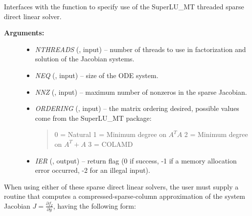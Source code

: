 \documentclass[letterpaper,10pt,english]{sphinxmanual}
\begin{document}
\begin{fulllineitems}
\label{f_interface/Usage:f/_/FARKSUPERLUMT}
Interfaces with the {\hyperref[c_interface/User_callable:c.ARKSuperLUMT]{\emph{}}} function
to specify use of the SuperLU\_MT threaded sparse direct linear solver.
\begin{description}
\item[{\textbf{Arguments:}}] \leavevmode\begin{itemize}
\item {} 
\emph{NTHREADS} (, input) -- number of threads to use in
factorization and solution of the Jacobian systems.

\item {} 
\emph{NEQ} (, input) -- size of the ODE system.

\item {} 
\emph{NNZ} (, input) -- maximum number of nonzeros in
the sparse Jacobian.

\item {} 
\emph{ORDERING} (, input) -- the matrix ordering desired,
possible values come from the SuperLU\_MT package:
\begin{quote}

0 = Natural
1 = Minimum degree on \(A^TA\)
2 = Minimum degree on \(A^T + A\)
3 = COLAMD
\end{quote}

\item {} 
\emph{IER} (, output) -- return flag (0 if success, -1 if a
memory allocation error occurred, -2 for an illegal input).

\end{itemize}

\end{description}

\end{fulllineitems}


When using either of these sparse direct linear solvers, the user must
supply a routine that computes a compressed-sparse-column
approximation of the system Jacobian \(J = \frac{\partial
f_I}{\partial y}\), having the following form:
\end{document}
